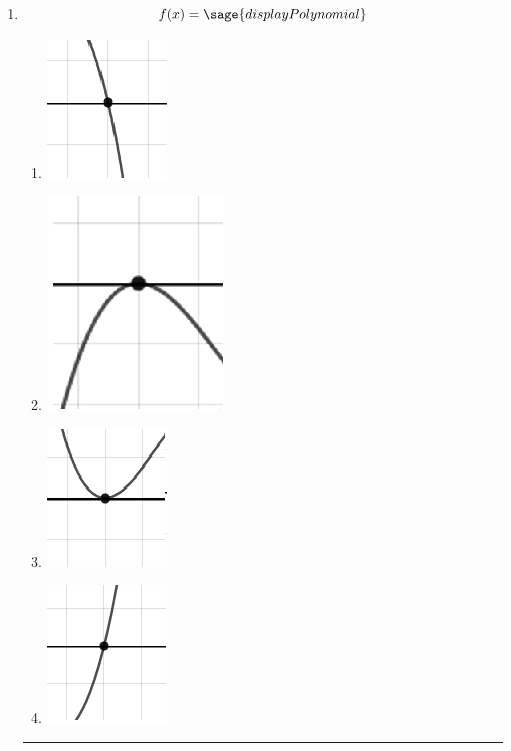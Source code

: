 \documentclass[14pt]{article}
\newcommand{\litem}[1]{\item#1\hspace*{-1cm}\rule{\textwidth}{0.4pt}}
\begin{document}
\begin{enumerate}
\litem{ 

	\[ f(x) = \sage{displayPolynomial} \]

\begin{multicols}{4}
	\begin{enumerate}[label=\Alph*.]
		\item \begin{center} \includegraphics[width=.2\textwidth]{../Figures/zeroBehaviorNegativeOddC}\end{center}
    \columnbreak
		\item \begin{center} \includegraphics[width=.2\textwidth]{../Figures/zeroBehaviorNegativeEvenC}\end{center}
    \columnbreak
		\item \begin{center} \includegraphics[width=.2\textwidth]{../Figures/zeroBehaviorPositiveEvenC}\end{center}
    \columnbreak
		\item \begin{center} \includegraphics[width=.2\textwidth]{../Figures/zeroBehaviorPositiveOddC}\end{center}
	\end{enumerate}
\end{multicols}
}

\end{enumerate}
\end{document}
